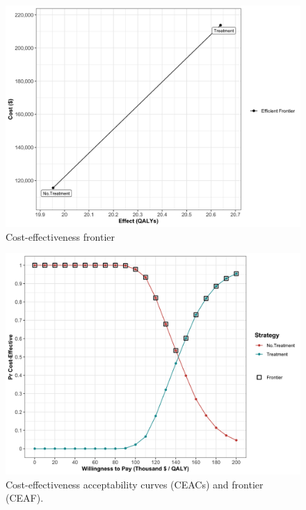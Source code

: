 \documentclass[]{book}
\begin{document}
\begin{figure}

{\centering \includegraphics[width=1\linewidth]{../figs/05b_cea_frontier_psa} 

}

\caption{Cost-effectiveness frontier}\label{fig:05b-cea-frontier-psa}
\end{figure}

\begin{figure}

{\centering \includegraphics[width=1\linewidth]{../figs/05b_ceac_ceaf} 

}

\caption{Cost-effectiveness acceptability curves (CEACs) and frontier (CEAF).}\label{fig:05b-ceac-ceaf}
\end{figure}
\end{document}
